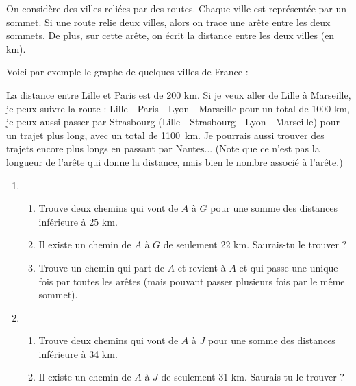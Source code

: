 \documentclass[class=report,crop=false, 12pt]{standalone}
\begin{document}
\begin{activite}
On considère des villes reliées par des routes. Chaque ville est représentée par 
un sommet. Si une route relie deux villes, alors on trace une arête entre les deux sommets. De plus, sur cette arête, on écrit la distance entre les deux villes (en km).

Voici par exemple le graphe de quelques villes de France :




La distance entre Lille et Paris est de 200 km.
Si je veux aller de Lille à Marseille, je peux suivre la route :
Lille - Paris - Lyon - Marseille pour un total de 1000 km, 
je peux aussi passer par Strasbourg (Lille - Strasbourg - Lyon - Marseille) pour un trajet  plus long, avec un total de 1100~km. Je pourrais aussi trouver des trajets encore plus longs en passant par Nantes...
(Note que ce n'est pas la longueur de l'arête 
qui donne la distance, mais bien le nombre associé à l'arête.)

\begin{enumerate}
  \item	\sauteligne
  

  \begin{enumerate}
    \item Trouve deux chemins qui vont de $A$ à $G$ pour une somme des distances inférieure à $25$ km. 
    
    \item Il existe un chemin  de $A$ à $G$ de seulement 22 km. Saurais-tu le trouver ?
  
    \item Trouve un chemin qui part de $A$ et revient à $A$ et qui passe une unique fois par toutes les arêtes (mais pouvant passer plusieurs fois par le même sommet).
  \end{enumerate}    

  \item \sauteligne
  

  \begin{enumerate}
    \item Trouve deux chemins qui vont de $A$ à $J$ pour une somme des distances inférieure à 34 km. 
    
    \item Il existe un chemin  de $A$ à $J$ de seulement 31 km. Saurais-tu le trouver ?
  

\end{enumerate}
\end{enumerate}
\end{activite}
\end{document}
